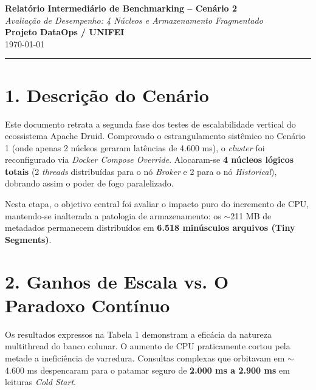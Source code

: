 \documentclass[12pt, a4paper]{article}
\begin{document}
\begin{center}
    \Large\textbf{Relatório Intermediário de Benchmarking -- Cenário 2} \\[0.2cm]
    \large\textit{Avaliação de Desempenho: 4 Núcleos e Armazenamento Fragmentado} \\[0.5cm]
    \normalsize\textbf{Projeto DataOps / UNIFEI} \\
    \small{\today}
\end{center}

\vspace{0.5cm}
\noindent\rule{\textwidth}{1pt}

\section*{1. Descrição do Cenário}
Este documento retrata a segunda fase dos testes de escalabilidade vertical do ecossistema Apache Druid. Comprovado o estrangulamento sistêmico no Cenário 1 (onde apenas 2 núcleos geraram latências de 4.600 ms), o \textit{cluster} foi reconfigurado via \textit{Docker Compose Override}. Alocaram-se \textbf{4 núcleos lógicos totais} (2 \textit{threads} distribuídas para o nó \textit{Broker} e 2 para o nó \textit{Historical}), dobrando assim o poder de fogo paralelizado.

Nesta etapa, o objetivo central foi avaliar o impacto puro do incremento de CPU, mantendo-se inalterada a patologia de armazenamento: os $\sim$211 MB de metadados permanecem distribuídos em \textbf{6.518 minúsculos arquivos (Tiny Segments)}.

\section*{2. Ganhos de Escala vs. O Paradoxo Contínuo}
Os resultados expressos na Tabela 1 demonstram a eficácia da natureza multithread do banco colunar. O aumento de CPU praticamente cortou pela metade a ineficiência de varredura. Consultas complexas que orbitavam em $\sim$4.600 ms despencaram para o patamar seguro de \textbf{2.000 ms a 2.900 ms} em leituras \textit{Cold Start}.
\end{document}
